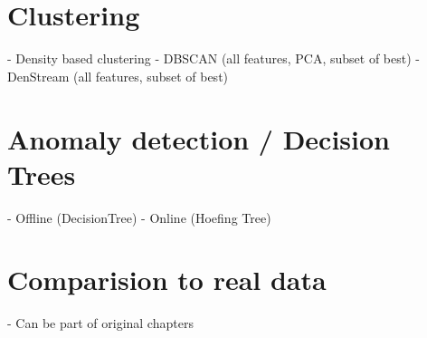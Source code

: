 \section{Clustering}
- Density based clustering
	- DBSCAN (all features, PCA, subset of best)
	- DenStream (all features, subset of best)

\section{Anomaly detection / Decision Trees}
- Offline (DecisionTree)
- Online (Hoefing Tree)

\section{Comparision to real data}
- Can be part of original chapters
